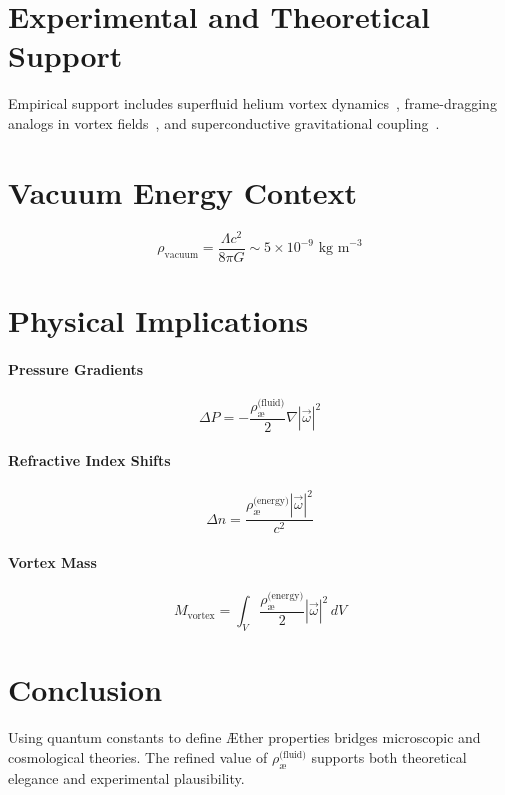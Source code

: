 \documentclass[12pt]{article}
\begin{document}
\section{Experimental and Theoretical Support}

Empirical support includes superfluid helium vortex dynamics~\cite{jackson2021}, frame-dragging analogs in vortex fields~\cite{paris2015}, and superconductive gravitational coupling~\cite{santiago2011}.

\section{Vacuum Energy Context}

\[
\rho_{\text{vacuum}} = \frac{\Lambda c^2}{8 \pi G} \sim 5 \times 10^{-9} \text{ kg m}^{-3}
\]

\section{Physical Implications}

\paragraph{Pressure Gradients}
\[
\Delta P = -\frac{\rho_{\text{\ae}}^{\text{(fluid)}}}{2} \nabla |\vec{\omega}|^2
\]

\paragraph{Refractive Index Shifts}
\[
\Delta n = \frac{\rho_{\text{\ae}}^{\text{(energy)}} |\vec{\omega}|^2}{c^2}
\]

\paragraph{Vortex Mass}
\[
M_{\text{vortex}} = \int_V \frac{\rho_{\text{\ae}}^{\text{(energy)}}}{2} |\vec{\omega}|^2 \, dV
\]

\section{Conclusion}

Using quantum constants to define Æther properties bridges microscopic and cosmological theories. The refined value of $\rho_{\text{\ae}}^{\text{(fluid)}}$ supports both theoretical elegance and experimental plausibility.


\ifdefined\standalonechapter\else
    
    
    
\end{document}
